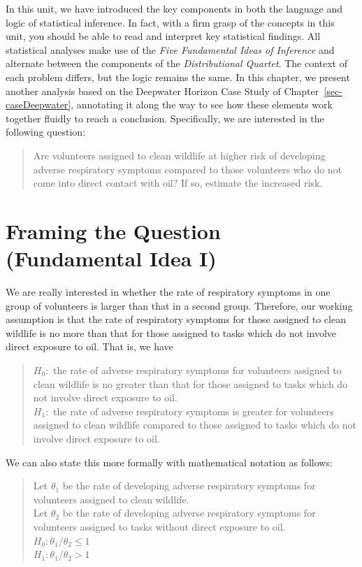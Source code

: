 \documentclass[
  letterpaper,
  DIV=11,
  numbers=noendperiod]{scrreprt}
\theoremstyle{plain}
\theoremstyle{definition}
\theoremstyle{definition}
\theoremstyle{remark}
\begin{document}
In this unit, we have introduced the key components in both the language
and logic of statistical inference. In fact, with a firm grasp of the
concepts in this unit, you should be able to read and interpret key
statistical findings. All statistical analyses make use of the
\emph{Five Fundamental Ideas of Inference} and alternate between the
components of the \emph{Distributional Quartet}. The context of each
problem differs, but the logic remains the same. In this chapter, we
present another analysis based on the Deepwater Horizon Case Study of
Chapter~\ref{sec-caseDeepwater}, annotating it along the way to see how
these elements work together fluidly to reach a conclusion.
Specifically, we are interested in the following question:

\begin{quote}
Are volunteers assigned to clean wildlife at higher risk of developing
adverse respiratory symptoms compared to those volunteers who do not
come into direct contact with oil? If so, estimate the increased risk.
\end{quote}

\hypertarget{framing-the-question-fundamental-idea-i}{%
\section{Framing the Question (Fundamental Idea
I)}\label{framing-the-question-fundamental-idea-i}}

We are really interested in whether the rate of respiratory symptoms in
one group of volunteers is larger than that in a second group.
Therefore, our working assumption is that the rate of respiratory
symptoms for those assigned to clean wildlife is no more than that for
those assigned to tasks which do not involve direct exposure to oil.
That is, we have

\begin{quote}
\(H_0:\) the rate of adverse respiratory symptoms for volunteers
assigned to clean wildlife is no greater than that for those assigned to
tasks which do not involve direct exposure to oil.\\
\(H_1:\) the rate of adverse respiratory symptoms is greater for
volunteers assigned to clean wildlife compared to those assigned to
tasks which do not involve direct exposure to oil.
\end{quote}

We can also state this more formally with mathematical notation as
follows:

\begin{quote}
Let \(\theta_1\) be the rate of developing adverse respiratory symptoms
for volunteers assigned to clean wildlife.\\
Let \(\theta_2\) be the rate of developing adverse respiratory symptoms
for volunteers assigned to tasks without direct exposure to oil.\\
\(H_0: \theta_1/\theta_2 \leq 1\)\\
\(H_1: \theta_1/\theta_2 > 1\)
\end{quote}
\end{document}
